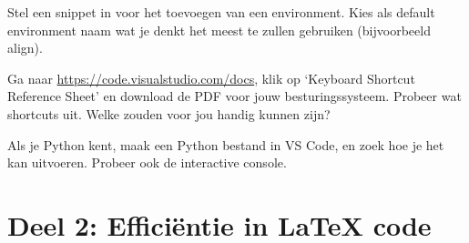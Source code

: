 \documentclass[a4paper]{article}
\begin{document}

\begin{exercise}
    Stel een snippet in voor het toevoegen van een environment. Kies als default environment
    naam wat je denkt het meest te zullen gebruiken (bijvoorbeeld align).
\end{exercise}

\begin{exercise}
    Ga naar \url{https://code.visualstudio.com/docs}, klik op `Keyboard Shortcut Reference Sheet'
    en download de PDF voor jouw besturingssysteem.
    Probeer wat shortcuts uit. Welke zouden voor jou handig kunnen zijn?
\end{exercise}


\begin{exercise}[Python]
    Als je Python kent, maak een Python bestand in VS Code, en zoek hoe je het kan
    uitvoeren. Probeer ook de interactive console.
\end{exercise}

\pagebreak
\section{Deel 2: Effici\"entie in LaTeX code}

\end{document}
